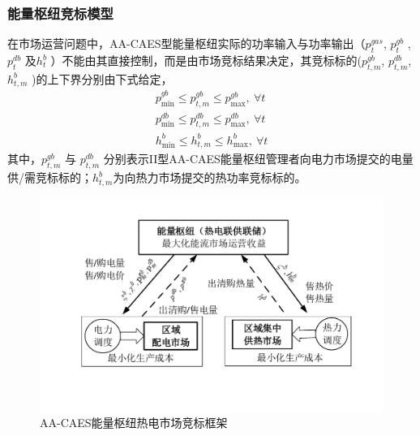 \subsubsection{能量枢纽竞标模型}
在市场运营问题中，AA-CAES型能量枢纽实际的功率输入与功率输出（$p_t^{gas}$, $p_t^{gb}$ , $p_t^{db}$ 及$h_t^b$ ）不能由其直接控制，而是由市场竞标结果决定，其竞标标的($p_{t,m}^{gb}$, $p_{t,m}^{db}$, $h_{t,m}^{b}$ )的上下界分别由下式给定，
\begin{subequations}
\label{eq:EH-Bid-Cons}
\begin{gather}
p_{\min }^{gb} \le p_{t,m}^{gb} \le p_{\max }^{gb}, ~\forall t \label{eq:EH-E-offer} \\
p_{\min }^{db} \le p_{t,m}^{db} \le p_{\max }^{db}, ~\forall t \label{eq:EH-E-bid} \\
h_{\min }^b \le h_{t,m}^b \le h_{\max }^b, ~\forall t \label{eq:EH-H-offer}
\end{gather}
\end{subequations}
其中，$p_{t,m}^{gb}$ 与 $p_{t,m}^{db}$ 分别表示II型AA-CAES能量枢纽管理者向电力市场提交的电量供/需竞标标的；$h_{t,m}^b$为向热力市场提交的热功率竞标标的。

\begin{figure}
\centering
\includegraphics[scale=0.75]{figures/Chap4-5-EH-PAB-Struct.pdf}
\caption{AA-CAES能量枢纽热电市场竞标框架}
\label{Fig:Market}
\end{figure}

